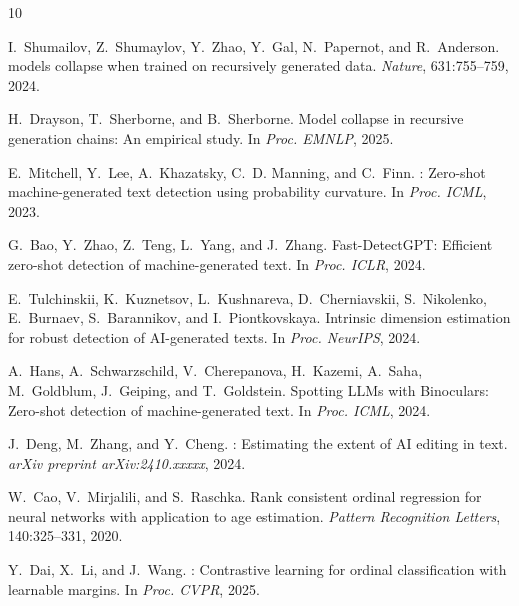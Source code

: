 \documentclass[11pt,a4paper]{article}
\begin{document}
\begin{thebibliography}{10}

I.~Shumailov, Z.~Shumaylov, Y.~Zhao, Y.~Gal, N.~Papernot, and R.~Anderson.
 models collapse when trained on recursively generated data.
\newblock \emph{Nature}, 631:755--759, 2024.

H.~Drayson, T.~Sherborne, and B.~Sherborne.
\newblock Model collapse in recursive generation chains: An empirical study.
\newblock In \emph{Proc. EMNLP}, 2025.

E.~Mitchell, Y.~Lee, A.~Khazatsky, C.~D. Manning, and C.~Finn.
: Zero-shot machine-generated text detection using probability curvature.
\newblock In \emph{Proc. ICML}, 2023.

G.~Bao, Y.~Zhao, Z.~Teng, L.~Yang, and J.~Zhang.
\newblock Fast-{DetectGPT}: Efficient zero-shot detection of machine-generated text.
\newblock In \emph{Proc. ICLR}, 2024.

E.~Tulchinskii, K.~Kuznetsov, L.~Kushnareva, D.~Cherniavskii, S.~Nikolenko, E.~Burnaev, S.~Barannikov, and I.~Piontkovskaya.
\newblock Intrinsic dimension estimation for robust detection of {AI}-generated texts.
\newblock In \emph{Proc. NeurIPS}, 2024.

A.~Hans, A.~Schwarzschild, V.~Cherepanova, H.~Kazemi, A.~Saha, M.~Goldblum, J.~Geiping, and T.~Goldstein.
\newblock Spotting {LLMs} with Binoculars: Zero-shot detection of machine-generated text.
\newblock In \emph{Proc. ICML}, 2024.

J.~Deng, M.~Zhang, and Y.~Cheng.
: Estimating the extent of {AI} editing in text.
\newblock \emph{arXiv preprint arXiv:2410.xxxxx}, 2024.

W.~Cao, V.~Mirjalili, and S.~Raschka.
\newblock Rank consistent ordinal regression for neural networks with application to age estimation.
\newblock \emph{Pattern Recognition Letters}, 140:325--331, 2020.

Y.~Dai, X.~Li, and J.~Wang.
: Contrastive learning for ordinal classification with learnable margins.
\newblock In \emph{Proc. CVPR}, 2025.

\end{thebibliography}
\end{document}
